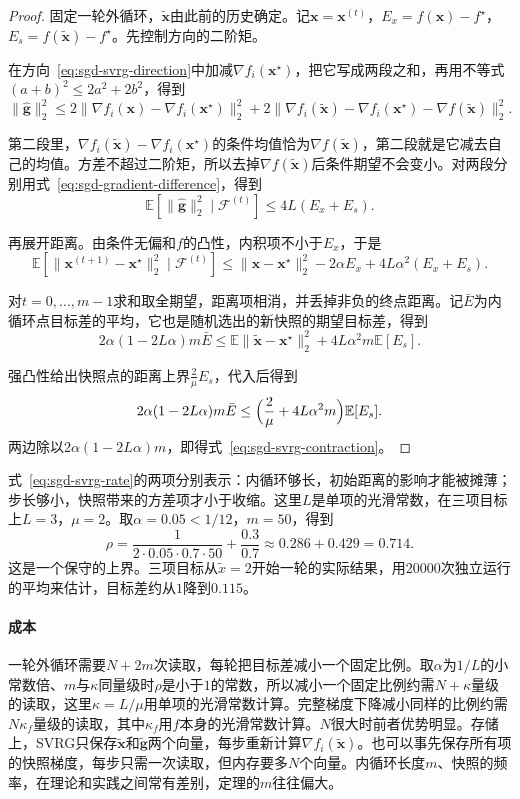 \begin{proof}
固定一轮外循环，$\tilde{\bm{x}}$由此前的历史确定。记$\bm{x}=\bm{x}^{(t)}$，$E_x=f(\bm{x})-f^\star$，$E_s=f(\tilde{\bm{x}})-f^\star$。先控制方向的二阶矩。

在方向~\eqref{eq:sgd-svrg-direction}中加减$\nabla f_i(\bm{x}^\star)$，把它写成两段之和，再用不等式$(a+b)^2\leq2a^2+2b^2$，得到
\[
 \lVert\hat{\bm{g}}\rVert_2^2\leq2\lVert\nabla f_i(\bm{x})-\nabla f_i(\bm{x}^\star)\rVert_2^2+2\lVert\nabla f_i(\tilde{\bm{x}})-\nabla f_i(\bm{x}^\star)-\nabla f(\tilde{\bm{x}})\rVert_2^2.
\]

第二段里，$\nabla f_i(\tilde{\bm{x}})-\nabla f_i(\bm{x}^\star)$的条件均值恰为$\nabla f(\tilde{\bm{x}})$，第二段就是它减去自己的均值。方差不超过二阶矩，所以去掉$\nabla f(\tilde{\bm{x}})$后条件期望不会变小。对两段分别用式~\eqref{eq:sgd-gradient-difference}，得到
\[
 \mathbb{E}[\lVert\hat{\bm{g}}\rVert_2^2\mid\mathcal{F}^{(t)}]\leq4L(E_x+E_s).
\]

再展开距离。由条件无偏和$f$的凸性，内积项不小于$E_x$，于是
\[
 \mathbb{E}[\lVert\bm{x}^{(t+1)}-\bm{x}^\star\rVert_2^2\mid\mathcal{F}^{(t)}]\leq\lVert\bm{x}-\bm{x}^\star\rVert_2^2-2\alpha E_x+4L\alpha^2(E_x+E_s).
\]

对$t=0,\ldots,m-1$求和取全期望，距离项相消，并丢掉非负的终点距离。记$\bar{E}$为内循环点目标差的平均，它也是随机选出的新快照的期望目标差，得到
\[
 2\alpha(1-2L\alpha)m\bar{E}\leq\mathbb{E}\lVert\tilde{\bm{x}}-\bm{x}^\star\rVert_2^2+4L\alpha^2m\mathbb{E}[E_s].
\]

强凸性给出快照点的距离上界$\tfrac{2}{\mu}E_s$，代入后得到
\[
 2\alpha(1-2L\alpha)m\bar{E}\leq\Bigl(\frac{2}{\mu}+4L\alpha^2m\Bigr)\mathbb{E}[E_s].
\]
两边除以$2\alpha(1-2L\alpha)m$，即得式~\eqref{eq:sgd-svrg-contraction}。
\end{proof}

式~\eqref{eq:sgd-svrg-rate}的两项分别表示：内循环够长，初始距离的影响才能被摊薄；步长够小，快照带来的方差项才小于收缩。这里$L$是单项的光滑常数，在三项目标上$L=3$，$\mu=2$。取$\alpha=0.05<1/12$，$m=50$，得到
\[
 \rho=\frac{1}{2\cdot0.05\cdot0.7\cdot50}+\frac{0.3}{0.7}\approx0.286+0.429=0.714.
\]
这是一个保守的上界。三项目标从$\tilde{x}=2$开始一轮的实际结果，用$20000$次独立运行的平均来估计，目标差约从$1$降到$0.115$。

\paragraph{成本}
一轮外循环需要$N+2m$次读取，每轮把目标差减小一个固定比例。取$\alpha$为$1/L$的小常数倍、$m$与$\kappa$同量级时$\rho$是小于$1$的常数，所以减小一个固定比例约需$N+\kappa$量级的读取，这里$\kappa=L/\mu$用单项的光滑常数计算。完整梯度下降减小同样的比例约需$N\kappa_f$量级的读取，其中$\kappa_f$用$f$本身的光滑常数计算。$N$很大时前者优势明显。存储上，SVRG只保存$\tilde{\bm{x}}$和$\tilde{\bm{g}}$两个向量，每步重新计算$\nabla f_i(\tilde{\bm{x}})$。也可以事先保存所有项的快照梯度，每步只需一次读取，但内存要多$N$个向量。内循环长度$m$、快照的频率，在理论和实践之间常有差别，定理的$m$往往偏大。

